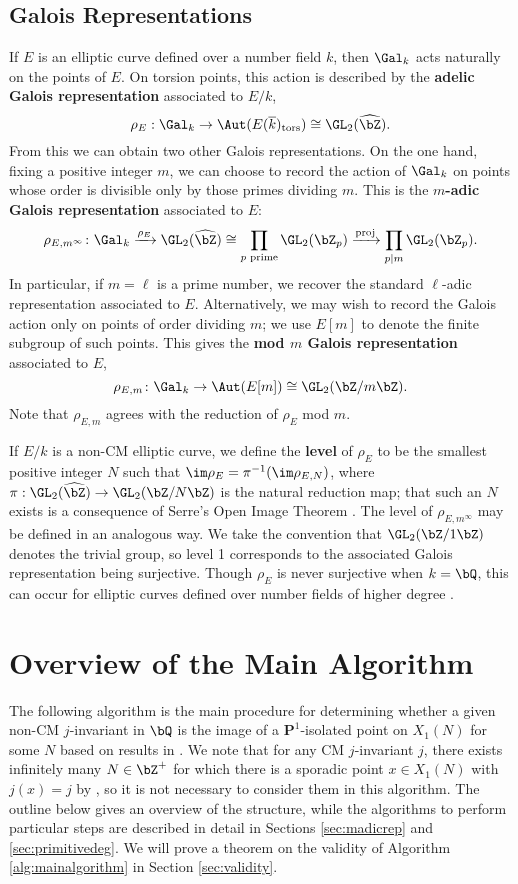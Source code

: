 \documentclass[11pt,reqno]{amsart}
\theoremstyle{plain}
\theoremstyle{definition}
\newcommand{\Q}{\bQ}
\newcommand{\Z}{\bZ}
\newcommand{\PP}{\mathbf P}
\newcommand{\proj}{\operatorname{proj}}
\begin{document}
\subsection{Galois Representations} If $E$ is an elliptic curve defined over a number field $k$, then $\Gal_k$ acts naturally on the points of $E$. On torsion points, this action is described by the \textbf{adelic Galois representation} associated to $E/k$,
\[
\rho_{E}: \Gal_k \rightarrow \Aut(E(\overline{k})_{\text{tors}}) \cong \GL_2(\widehat{\Z}).
\]
From this we can obtain two other Galois representations. On the one hand, fixing a positive integer $m$, we can choose to record the action of $\Gal_k$ on points whose order is divisible only by those primes dividing $m$. This is the \textbf{$m$-adic Galois representation} associated to $E$:
\[
\rho_{E,m^{\infty}}\colon \Gal_k \xrightarrow{\rho_E} \GL_2(\widehat{\Z}) \cong  \prod_{p \text{ prime}} \GL_2(\Z_{p}) \xrightarrow{\proj} \prod_{p \mid m} \GL_2(\Z_{p}).
\]
In particular, if $m=\ell$ is a prime number, we recover the standard $\ell$-adic representation associated to $E$. Alternatively, we may wish to record the Galois action only on points of order dividing $m$; we use $E[m]$ to denote the finite subgroup of such points. This gives the \textbf{mod $m$ Galois representation} associated to $E$,
\[
\rho_{E,m}\colon \Gal_k \rightarrow \Aut(E[m]) \cong \GL_2(\Z/m\Z).
\]
Note that $\rho_{E,m}$ agrees with the reduction of $\rho_E$ mod $m$.

If $E/k$ is a non-CM elliptic curve, we define the \textbf{level} of $\rho_E$ to be the smallest positive integer $N$ such that $\im \rho_E=\pi^{-1}(\im \rho_{E,N})$, where $\pi:\GL_2(\widehat{\Z}) \rightarrow \GL_2(\Z/N\Z)$ is the natural reduction map; that such an $N$ exists is a consequence of Serre's Open Image Theorem \cite{serre72}. The level of $\rho_{E,m^{\infty}}$ may be defined in an analogous way. We take the convention that $\GL_2(\Z/1\Z)$ denotes the trivial group, so level 1 corresponds to the associated Galois representation being surjective. Though $\rho_E$ is never surjective when $k=\Q$, this can occur for elliptic curves defined over number fields of higher degree \cite[Theorem 1.2]{Greicius2010}.

\section{Overview of the Main Algorithm}
\label{sec:mainalg}
The following algorithm is the main procedure for determining whether a given non-CM $j$-invariant in $\Q$ is the image of a $\PP^1$-isolated point on $X_1(N)$ for some $N$ based on results in \cite{BELOV,ZywinaAlgorithm}. We note that for any CM $j$-invariant $j$, there exists infinitely many $N\in\Z^+$ for which there is a sporadic point $x\in X_1(N)$ with $j(x)=j$ by \cite[Theorem 7.1]{BELOV}, so it is not necessary to consider them in this algorithm. The outline below gives an overview of the structure, while the algorithms to perform particular steps are described in detail in Sections \ref{sec:madicrep} and \ref{sec:primitivedeg}. We will prove a theorem on the validity of Algorithm \ref{alg:mainalgorithm} in Section \ref{sec:validity}.
\end{document}
